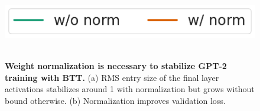 \documentclass{article}
\theoremstyle{plain}
\theoremstyle{definition}
\theoremstyle{remark}
\begin{document}
\begin{figure}[!t]
\centering
    \includegraphics[width=0.6\linewidth]{figs/norm_legend.pdf}
    \\
     \\
   \caption{
   \textbf{Weight normalization is necessary to stabilize GPT-2 training with BTT.} (a) RMS entry size of the final layer activations stabilizes around 1 with normalization but grows without bound otherwise. (b) Normalization improves validation loss.
   }
    \label{fig:btt_norm}
    \vspace{-5mm}
\end{figure}
\end{document}
